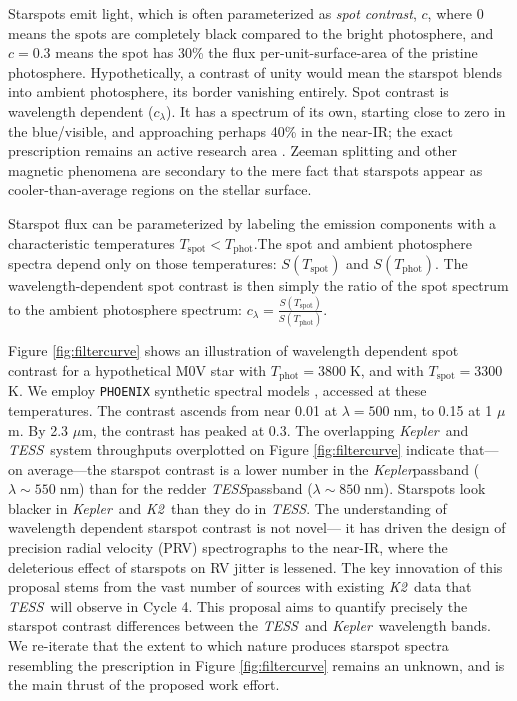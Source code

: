 \documentclass[modern]{aastex631}
\newcommand{\tess}{{\it TESS}}
\newcommand{\kepler}{{\it Kepler}}
\newcommand{\ktwo}{{\it K2}}
\begin{document}
Starspots emit light, which is often parameterized as \emph{spot contrast}, $c$, where $0$ means the spots are completely black compared to the bright photosphere, and $c=0.3$ means the spot has 30\% the flux per-unit-surface-area of the pristine photosphere.  Hypothetically, a contrast of unity would mean the starspot blends into ambient photosphere, its border vanishing entirely.  Spot contrast is wavelength dependent ($c_\lambda$). It has a spectrum of its own, starting close to zero in the blue/visible, and approaching perhaps 40\% in the near-IR; the exact prescription remains an active research area \cite{2005LRSP....2....8B}.  Zeeman splitting and other magnetic phenomena are secondary to the mere fact that starspots appear as cooler-than-average regions on the stellar surface.

Starspot flux can be parameterized by labeling the emission components with a characteristic temperatures
$T_\mathrm{spot}<T_\mathrm{phot}$.The spot and ambient photosphere spectra depend only on those temperatures: $S(T_\mathrm{spot})$ and $S(T_\mathrm{phot})$.  The wavelength-dependent spot contrast is then simply the ratio of the spot spectrum to the ambient photosphere spectrum:  $c_\lambda = \frac{S(T_\mathrm{spot})}{ S(T_\mathrm{phot})}$.

Figure \ref{fig:filtercurve} shows an illustration of wavelength dependent spot contrast for a hypothetical M0V star with $T_\mathrm{phot}=3800\;$K, and with $T_\mathrm{spot}=3300\;$K.  We employ \texttt{PHOENIX} synthetic spectral models \cite{2013A&A...553A...6H}, accessed at these temperatures.  The contrast ascends from near 0.01 at $\lambda=500\;$nm, to 0.15 at 1 $\mu$m.  By 2.3 $\mu$m, the contrast has peaked at 0.3.  The overlapping \kepler\ and \tess\ system throughputs overplotted on Figure \ref{fig:filtercurve} indicate that---on average---the starspot contrast is a lower number in the \kepler passband ($\lambda \sim 550\;$nm)  than for the redder \tess passband ($\lambda \sim 850\;$nm).  Starspots look blacker in \kepler\ and \ktwo\ than they do in \tess.  The understanding of wavelength dependent starspot contrast is not novel--- it has driven the design of precision radial velocity (PRV) spectrographs to the near-IR, where the deleterious effect of starspots on RV jitter is lessened.  The key innovation of this proposal stems from the vast number of sources with existing \ktwo\ data that \tess\ will observe in Cycle 4.  This proposal aims to quantify precisely the starspot contrast differences between the \tess\ and \kepler\ wavelength bands.  We re-iterate that the extent to which nature produces starspot spectra resembling the prescription in Figure \ref{fig:filtercurve} remains an unknown, and is the main thrust of the proposed work effort.
\end{document}
